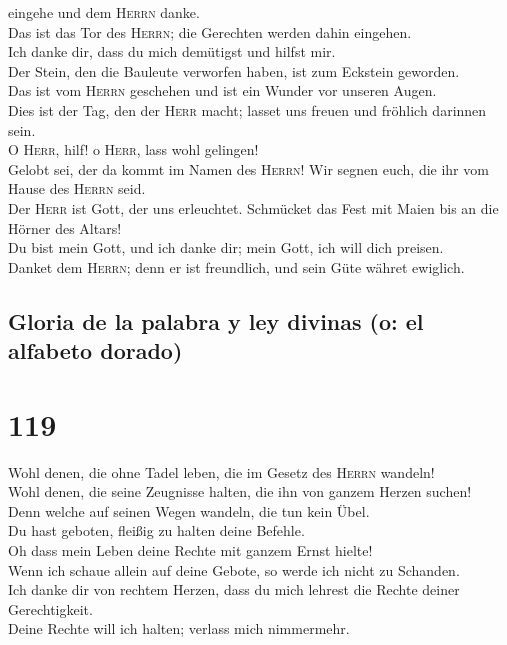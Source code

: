 eingehe und dem \textsc{Herrn} danke.\\
 Das ist das Tor des \textsc{Herrn}; die Gerechten werden
dahin eingehen.\\
 Ich danke dir, dass du mich demütigst und hilfst mir.\\
 Der Stein, den die Bauleute verworfen haben, ist zum
Eckstein geworden.\\
 Das ist vom \textsc{Herrn} geschehen und ist ein Wunder
vor unseren Augen.\\
 Dies ist der Tag, den der \textsc{Herr} macht; lasset
uns freuen und fröhlich darinnen sein.\\
 O \textsc{Herr}, hilf! o \textsc{Herr}, lass wohl
gelingen!\\
 Gelobt sei, der da kommt im Namen des \textsc{Herrn}!
Wir segnen euch, die ihr vom Hause des \textsc{Herrn} seid.\\
 Der \textsc{Herr} ist Gott, der uns erleuchtet.
Schmücket das Fest mit Maien bis an die Hörner des Altars!\\
 Du bist mein Gott, und ich danke dir; mein Gott, ich
will dich preisen.\\
 Danket dem \textsc{Herrn}; denn er ist freundlich, und
sein Güte währet ewiglich.

\hypertarget{gloria-de-la-palabra-y-ley-divinas-o-el-alfabeto-dorado}{%
\subsection{Gloria de la palabra y ley divinas (o: el alfabeto
dorado)}\label{gloria-de-la-palabra-y-ley-divinas-o-el-alfabeto-dorado}}

\hypertarget{section-118}{%
\section{119}\label{section-118}}

 Wohl denen, die ohne Tadel leben, die im Gesetz des
\textsc{Herrn} wandeln!\\
 Wohl denen, die seine Zeugnisse halten, die ihn von
ganzem Herzen suchen!\\
 Denn welche auf seinen Wegen wandeln, die tun kein
Übel.\\
 Du hast geboten, fleißig zu halten deine Befehle.\\
 Oh dass mein Leben deine Rechte mit ganzem Ernst
hielte!\\
 Wenn ich schaue allein auf deine Gebote, so werde ich
nicht zu Schanden.\\
 Ich danke dir von rechtem Herzen, dass du mich lehrest
die Rechte deiner Gerechtigkeit.\\
 Deine Rechte will ich halten; verlass mich nimmermehr.

